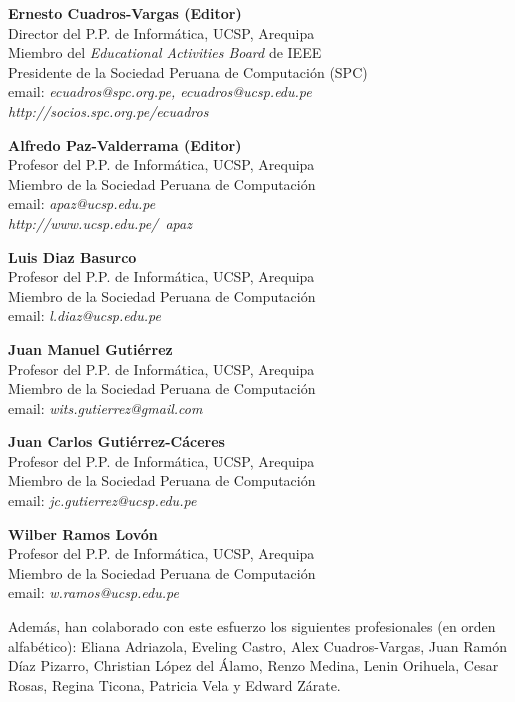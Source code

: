 
\begin{center}
\textbf{Ernesto Cuadros-Vargas (Editor)}\\
Director del P.P. de Informática, UCSP, Arequipa\\
Miembro del \textit{Educational Activities Board} de IEEE\\
Presidente de la Sociedad Peruana de Computación (SPC)\\
email: \textit{ecuadros@spc.org.pe, ecuadros@ucsp.edu.pe}\\
\textit{http://socios.spc.org.pe/ecuadros}
\end{center}

\begin{center}
\textbf{Alfredo Paz-Valderrama (Editor)}\\
Profesor del P.P. de Informática, UCSP, Arequipa\\
Miembro de la Sociedad Peruana de Computación\\
email: \textit{apaz@ucsp.edu.pe}\\
\textit{http://www.ucsp.edu.pe/~apaz}
\end{center}

\begin{center}
\textbf{Luis Diaz Basurco}\\
Profesor del P.P. de Informática, UCSP, Arequipa\\
Miembro de la Sociedad Peruana de Computación\\
email: \textit{l.diaz@ucsp.edu.pe}
\end{center}

\begin{center}
\textbf{Juan Manuel Gutiérrez}\\
Profesor del P.P. de Informática, UCSP, Arequipa\\
Miembro de la Sociedad Peruana de Computación\\
email: \textit{wits.gutierrez@gmail.com}
\end{center}


\begin{center}
\textbf{Juan Carlos Gutiérrez-Cáceres}\\
Profesor del P.P. de Informática, UCSP, Arequipa\\
Miembro de la Sociedad Peruana de Computación\\
email: \textit{jc.gutierrez@ucsp.edu.pe}
\end{center}

\begin{center}
\textbf{Wilber Ramos Lovón}\\
Profesor del P.P. de Informática, UCSP, Arequipa\\
Miembro de la Sociedad Peruana de Computación\\
email: \textit{w.ramos@ucsp.edu.pe}
\end{center}

Además, han colaborado con este esfuerzo los siguientes profesionales (en orden alfabético): Eliana Adriazola, Eveling Castro, Alex Cuadros-Vargas, Juan Ramón Dí­az Pizarro, Christian López del Álamo, Renzo Medina, Lenin Orihuela, Cesar Rosas, Regina Ticona, Patricia Vela y Edward Zárate.
\newpage